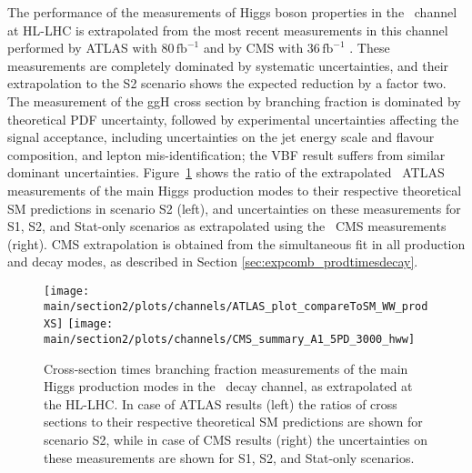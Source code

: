 The performance of the measurements of Higgs boson properties in the \HWW\ channel at HL-LHC is extrapolated from the most recent measurements in this channel performed by ATLAS with 80\,$\mathrm{fb}^{-1}$ \cite{Aaboud:2018jqu} and by CMS with 36\,$\mathrm{fb}^{-1}$ \cite{Sirunyan:2018egh}. These measurements are completely dominated by systematic uncertainties, and their extrapolation to the S2 scenario shows the expected reduction by a factor two. The measurement of the ggH cross section by branching fraction is dominated by theoretical PDF uncertainty, followed by experimental uncertainties affecting the signal acceptance, including uncertainties on the jet energy scale and flavour composition, and lepton mis-identification; the VBF result suffers from similar dominant uncertainties.
Figure~\ref{fig:HWW_ATLAS_HLLHC_S2} shows the ratio of the extrapolated \HWW\ ATLAS measurements of the main Higgs production modes to their respective theoretical SM predictions in scenario S2 (left), and uncertainties on these measurements for S1, S2, and Stat-only scenarios as extrapolated using the \HWW\ CMS measurements (right). CMS extrapolation is obtained from the simultaneous fit in all production and decay modes, as described in Section \ref{sec:expcomb_prodtimesdecay}.

\begin{figure}
  \centering
  \texttt{[image: \\main/section2/plots/channels/ATLAS\_plot\_compareToSM\_WW\_prodXS]}
  \texttt{[image: \\main/section2/plots/channels/CMS\_summary\_A1\_5PD\_3000\_hww]}
  \caption{Cross-section times branching fraction measurements of the main Higgs production modes in the \HWW\ decay channel, as extrapolated at the HL-LHC. In case of ATLAS results (left) the ratios of cross sections to their respective theoretical SM predictions are shown for scenario S2, while in case of CMS results (right) the uncertainties on these measurements are shown for S1, S2, and Stat-only scenarios.}
  \label{fig:HWW_ATLAS_HLLHC_S2}
\end{figure}
